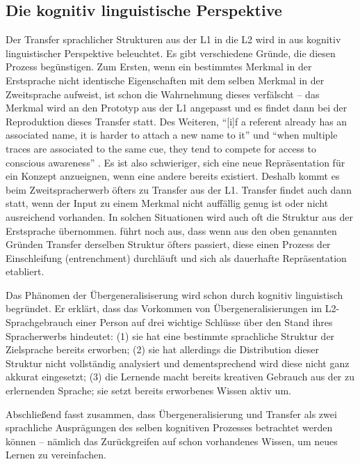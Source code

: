 \subsection{Die kognitiv linguistische Perspektive}
Der Transfer sprachlicher Strukturen aus der L1 in die L2 wird in \cite{Ellis06} aus kognitiv linguistischer Perspektive beleuchtet.
Es gibt verschiedene Gründe, die diesen Prozess begünstigen.
Zum Ersten, wenn ein bestimmtes Merkmal in der Erstsprache nicht identische Eigenschaften mit dem selben Merkmal in der Zweitsprache aufweist, ist schon die Wahrnehmung dieses verfälscht --
das Merkmal wird an den Prototyp aus der L1 angepasst und es findet dann bei der Reproduktion dieses Transfer statt.
Des Weiteren, ``[i]f a referent already has an associated name, it is harder to attach a new name to it'' und
``when multiple traces are associated to the same cue, they tend to compete for access to conscious awareness'' \cite{Ellis06}.
Es ist also schwieriger, sich eine neue Repräsentation für ein Konzept anzueignen, wenn eine andere bereits existiert.
Deshalb kommt es beim Zweitspracherwerb öfters zu Transfer aus der L1.
Transfer findet auch dann statt, wenn der Input zu einem Merkmal nicht auffällig genug ist oder nicht ausreichend vorhanden.
In solchen Situationen wird auch oft die Struktur aus der Erstsprache übernommen.
\cite{Ellis06} führt noch aus, dass wenn aus den oben genannten Gründen Transfer derselben Struktur öfters passiert, diese einen Prozess der Einschleifung (entrenchment) durchläuft und sich als dauerhafte Repräsentation etabliert.

Das Phänomen der Übergeneralisiserung wird schon durch \cite{Taylor75} kognitiv linguistisch begründet.
Er erklärt, dass das Vorkommen von Übergeneralisierungen im L2-Sprachgebrauch einer Person auf drei wichtige Schlüsse über den Stand ihres Spracherwerbs hindeutet:
(1) sie hat eine bestimmte sprachliche Struktur der Zielsprache bereits erworben;
(2) sie hat allerdings die Distribution dieser Struktur nicht vollständig analysiert und dementsprechend wird diese nicht ganz akkurat eingesetzt;
(3) die Lernende macht bereits kreativen Gebrauch aus der zu erlernenden Sprache; sie setzt bereits erworbenes Wissen aktiv um.

Abschließend fasst \cite{Taylor75} zusammen, dass Übergeneralisierung und Transfer als zwei sprachliche Ausprägungen des selben kognitiven Prozesses betrachtet werden können --
nämlich das Zurückgreifen auf schon vorhandenes Wissen, um neues Lernen zu vereinfachen.



